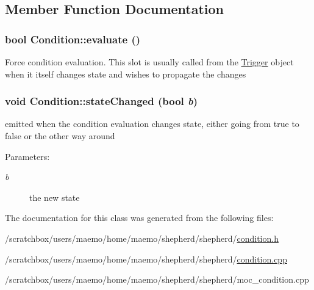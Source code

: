 \subsection{Member Function Documentation}
\hypertarget{class_condition_1ed8dccd3394ae01378788f66f072f8f}{
\subsubsection[{evaluate}]{\setlength{\rightskip}{0pt plus 5cm}bool Condition::evaluate ()}}
\label{class_condition_1ed8dccd3394ae01378788f66f072f8f}


Force condition evaluation. This slot is usually called from the \hyperlink{interface_trigger}{Trigger} object when it itself changes state and wishes to propagate the changes \hypertarget{class_condition_edef85651f9da74dc23c179a2bebcae9}{
\subsubsection[{stateChanged}]{\setlength{\rightskip}{0pt plus 5cm}void Condition::stateChanged (bool {\em b})}}
\label{class_condition_edef85651f9da74dc23c179a2bebcae9}


emitted when the condition evaluation changes state, either going from true to false or the other way around

\begin{Desc}
\item[Parameters:]
\begin{description}
\item[{\em b}]the new state \end{description}
\end{Desc}


The documentation for this class was generated from the following files:\begin{CompactItemize}
\item 
/scratchbox/users/maemo/home/maemo/shepherd/shepherd/\hyperlink{condition_8h}{condition.h}\item 
/scratchbox/users/maemo/home/maemo/shepherd/shepherd/\hyperlink{condition_8cpp}{condition.cpp}\item 
/scratchbox/users/maemo/home/maemo/shepherd/shepherd/moc\_\-condition.cpp\end{CompactItemize}
